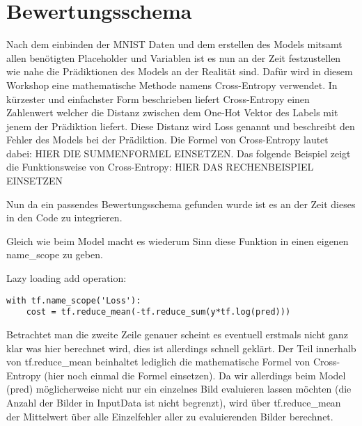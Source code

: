 \chapter{Bewertungsschema}

Nach dem einbinden der MNIST Daten und dem erstellen des Models mitsamt allen benötigten Placeholder und Variablen ist es nun an der Zeit festzustellen wie nahe die Prädiktionen des Models an der Realität sind. Dafür wird in diesem Workshop eine mathematische Methode namens Cross-Entropy verwendet. In kürzester und einfachster Form beschrieben liefert Cross-Entropy einen Zahlenwert welcher die Distanz zwischen dem One-Hot Vektor des Labels mit jenem der Prädiktion liefert. Diese Distanz wird Loss genannt und beschreibt den Fehler des Models bei der Prädiktion. Die Formel von Cross-Entropy lautet dabei: HIER DIE SUMMENFORMEL EINSETZEN. Das folgende Beispiel zeigt die Funktionsweise von Cross-Entropy: HIER DAS RECHENBEISPIEL EINSETZEN

Nun da ein passendes Bewertungsschema gefunden wurde ist es an der Zeit dieses in den Code zu integrieren.

Gleich wie beim Model macht es wiederum Sinn diese Funktion in einen eigenen name_scope zu geben.


\lstset{language=Python}

Lazy loading add operation:

\begin{lstlisting}
with tf.name_scope('Loss'):
	cost = tf.reduce_mean(-tf.reduce_sum(y*tf.log(pred)))
\end{lstlisting}


Betrachtet man die zweite Zeile genauer scheint es eventuell erstmals nicht ganz klar was hier berechnet wird, dies ist allerdings schnell geklärt.
Der Teil innerhalb von tf.reduce_mean beinhaltet lediglich die mathematische Formel von Cross-Entropy (hier noch einmal die Formel einsetzen). Da wir allerdings beim Model (pred) möglicherweise nicht nur ein einzelnes Bild evaluieren lassen möchten (die Anzahl der Bilder in InputData ist nicht begrenzt), wird über tf.reduce_mean der Mittelwert über alle Einzelfehler aller zu evaluierenden Bilder berechnet.


\label{cha:Bewertungsschema}